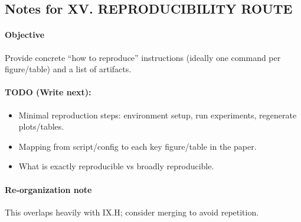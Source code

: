 \subsection*{Notes for XV. REPRODUCIBILITY ROUTE}
\paragraph{Objective}
Provide concrete “how to reproduce” instructions (ideally one command per figure/table) and a list of artifacts.

\paragraph{TODO (Write next):}
\begin{itemize}
  \item Minimal reproduction steps: environment setup, run experiments, regenerate plots/tables.
  \item Mapping from script/config to each key figure/table in the paper.
  \item What is exactly reproducible vs broadly reproducible.
\end{itemize}

\paragraph{Re-organization note}
This overlaps heavily with IX.H; consider merging to avoid repetition.
